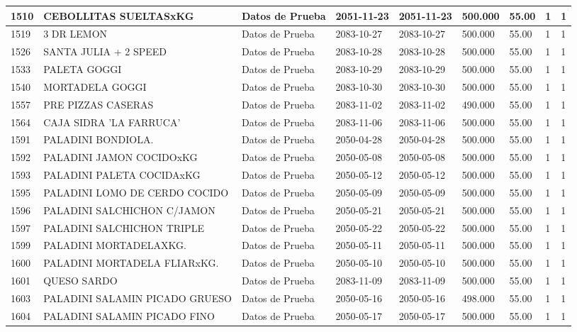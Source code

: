 \documentclass[a4paper,12pt]{article}
\begin{document}
\begin{landscape}
\begin{longtable}{|p{4cm}|p{2.5cm}|p{2.5cm}|p{1.8cm}|p{1.8cm}|p{1cm}|p{1cm}|p{3cm}|p{3cm}||}
1510 & CEBOLLITAS SUELTASxKG & Datos de Prueba & 2051-11-23 & 2051-11-23 & 500.000 & 55.00 & 1 & 1 \\ \hline 
1519 & 3 DR LEMON & Datos de Prueba & 2083-10-27 & 2083-10-27 & 500.000 & 55.00 & 1 & 1 \\ \hline 
1526 & SANTA JULIA + 2 SPEED & Datos de Prueba & 2083-10-28 & 2083-10-28 & 500.000 & 55.00 & 1 & 1 \\ \hline 
1533 & PALETA GOGGI & Datos de Prueba & 2083-10-29 & 2083-10-29 & 500.000 & 55.00 & 1 & 1 \\ \hline 
1540 & MORTADELA GOGGI & Datos de Prueba & 2083-10-30 & 2083-10-30 & 500.000 & 55.00 & 1 & 1 \\ \hline 
1557 & PRE PIZZAS CASERAS & Datos de Prueba & 2083-11-02 & 2083-11-02 & 490.000 & 55.00 & 1 & 1 \\ \hline 
1564 & CAJA SIDRA  'LA FARRUCA' & Datos de Prueba & 2083-11-06 & 2083-11-06 & 500.000 & 55.00 & 1 & 1 \\ \hline 
1591 & PALADINI BONDIOLA. & Datos de Prueba & 2050-04-28 & 2050-04-28 & 500.000 & 55.00 & 1 & 1 \\ \hline 
1592 & PALADINI JAMON COCIDOxKG & Datos de Prueba & 2050-05-08 & 2050-05-08 & 500.000 & 55.00 & 1 & 1 \\ \hline 
1593 & PALADINI PALETA COCIDAxKG & Datos de Prueba & 2050-05-12 & 2050-05-12 & 500.000 & 55.00 & 1 & 1 \\ \hline 
1595 & PALADINI LOMO DE CERDO COCIDO & Datos de Prueba & 2050-05-09 & 2050-05-09 & 500.000 & 55.00 & 1 & 1 \\ \hline 
1596 & PALADINI SALCHICHON C/JAMON & Datos de Prueba & 2050-05-21 & 2050-05-21 & 500.000 & 55.00 & 1 & 1 \\ \hline 
1597 & PALADINI SALCHICHON TRIPLE & Datos de Prueba & 2050-05-22 & 2050-05-22 & 500.000 & 55.00 & 1 & 1 \\ \hline 
1599 & PALADINI MORTADELAXKG. & Datos de Prueba & 2050-05-11 & 2050-05-11 & 500.000 & 55.00 & 1 & 1 \\ \hline 
1600 & PALADINI MORTADELA FLIARxKG. & Datos de Prueba & 2050-05-10 & 2050-05-10 & 500.000 & 55.00 & 1 & 1 \\ \hline 
1601 & QUESO SARDO & Datos de Prueba & 2083-11-09 & 2083-11-09 & 500.000 & 55.00 & 1 & 1 \\ \hline 
1603 & PALADINI SALAMIN PICADO GRUESO & Datos de Prueba & 2050-05-16 & 2050-05-16 & 498.000 & 55.00 & 1 & 1 \\ \hline 
1604 & PALADINI SALAMIN PICADO FINO & Datos de Prueba & 2050-05-17 & 2050-05-17 & 500.000 & 55.00 & 1 & 1 \\ \hline 

\end{longtable}
\end{landscape}
\end{document}
